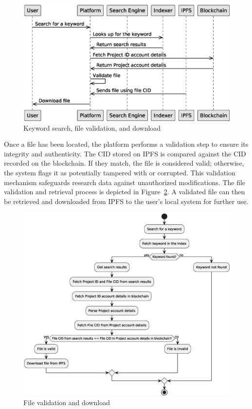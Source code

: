 \documentclass[final]{rc-book-2.14}
\begin{document}
\begin{figure}[htbp]
    \centering
    \includegraphics[scale=0.5]{fig/c4_searching_and_validation.eps}
    \caption{Keyword search, file validation, and download}
    \label{fig:c4_keyword_search}
\end{figure}

Once a file has been located, the platform performs a validation step to ensure its integrity and authenticity. The CID stored on IPFS is compared against the CID recorded on the blockchain. If they match, the file is considered valid; otherwise, the system flags it as potentially tampered with or corrupted. This validation mechanism safeguards research data against unauthorized modifications. The file validation and retrieval process is depicted in Figure~\ref{fig:c4_file_validation}. A validated file can then be retrieved and downloaded from IPFS to the user's local system for further use.

\begin{figure}[htbp]
    \centering
    \includegraphics[scale=0.5]{fig/keyword_and_file_validation.eps}
    \caption{File validation and download}
    \label{fig:c4_file_validation}
\end{figure}
\end{document}
